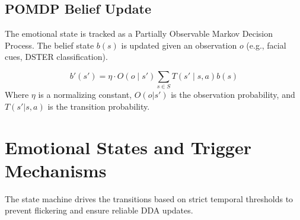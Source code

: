 \documentclass[11pt,a4paper]{article}
\begin{document}
\subsection{POMDP Belief Update}
The emotional state is tracked as a Partially Observable Markov Decision Process. The belief state $b(s)$ is updated given an observation $o$ (e.g., facial cues, DSTER classification).

\begin{equation}
    b'(s') = \eta \cdot O(o \mid s') \sum_{s \in S} T(s' \mid s, a) b(s)
\end{equation}
Where $\eta$ is a normalizing constant, $O(o|s')$ is the observation probability, and $T(s'|s,a)$ is the transition probability.

\section{Emotional States and Trigger Mechanisms}

The state machine drives the transitions based on strict temporal thresholds to prevent flickering and ensure reliable DDA updates.

\begin{table}[ht!]
    \centering
    \renewcommand{\arraystretch}{1.3}
    \caption{Project ECHO Live Demo State Machine Transitions and Thresholds.}
    \label{tab:state_machine}
\end{table}
\end{document}

